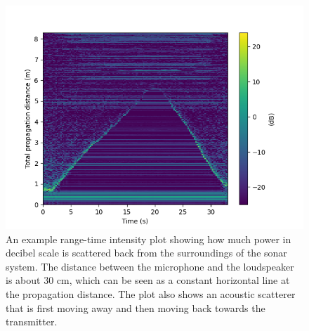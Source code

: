 \begin{enumerate}[a)]
  \begin{figure}
  \begin{center}
    \includegraphics[width=\textwidth]{Assignments/figures/sonar_rti.png}
  \end{center}
  \caption{An example range-time intensity plot showing how much power
    in decibel scale is scattered back from the surroundings of the
    sonar system. The distance between the microphone and the
    loudspeaker is about 30 cm, which can be seen as a constant
    horizontal line at the propagation distance. The plot also shows an
    acoustic scatterer that is first moving away and then moving back
    towards the transmitter.}
  \label{fig:ex_rti_plot}
\end{figure}

\end{enumerate}
